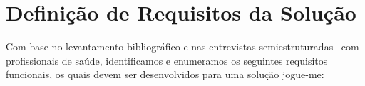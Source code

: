 %
%
%
%

\section{Definição de Requisitos da Solução}\label{section:requisitos_solucao}
Com base no levantamento bibliográfico e nas entrevistas semiestruturadas~\cite{FLI04} com profissionais de saúde, identificamos e enumeramos os seguintes requisitos funcionais, os quais devem ser desenvolvidos para uma solução \ac{jogue-me}:

